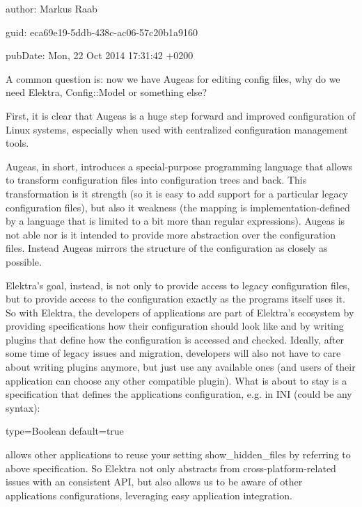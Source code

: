 
\begin{DoxyItemize}
\item author\+: Markus Raab
\item guid\+: eca69e19-\/5ddb-\/438c-\/ac06-\/57c20b1a9160
\item pub\+Date\+: Mon, 22 Oct 2014 17\+:31\+:42 +0200
\end{DoxyItemize}

A common question is\+: now we have Augeas for editing config files, why do we need Elektra, Config\+::\+Model or something else?

First, it is clear that Augeas is a huge step forward and improved configuration of Linux systems, especially when used with centralized configuration management tools.

Augeas, in short, introduces a special-\/purpose programming language that allows to transform configuration files into configuration trees and back. This transformation is it strength (so it is easy to add support for a particular legacy configuration files), but also it weakness (the mapping is implementation-\/defined by a language that is limited to a bit more than regular expressions). Augeas is not able nor is it intended to provide more abstraction over the configuration files. Instead Augeas mirrors the structure of the configuration as closely as possible.

Elektra’s goal, instead, is not only to provide access to legacy configuration files, but to provide access to the configuration exactly as the programs itself uses it. So with Elektra, the developers of applications are part of Elektra’s ecosystem by providing specifications how their configuration should look like and by writing plugins that define how the configuration is accessed and checked. Ideally, after some time of legacy issues and migration, developers will also not have to care about writing plugins anymore, but just use any available ones (and users of their application can choose any other compatible plugin). What is about to stay is a specification that defines the application\textquotesingle{}s configuration, e.\+g. in I\+NI (could be any syntax)\+: \begin{DoxyVerb}
type=Boolean
default=true
\end{DoxyVerb}


allows other applications to reuse your setting show\+\_\+hidden\+\_\+files by referring to above specification. So Elektra not only abstracts from cross-\/platform-\/related issues with an consistent A\+PI, but also allows us to be aware of other applications\textquotesingle{} configurations, leveraging easy application integration.

